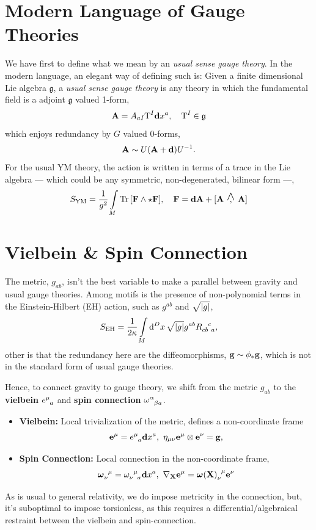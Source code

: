 \documentclass[a0,portrait]{a0poster}
\newcommand{\wedgecomma}{\stackon[1pt]{,}{\smash{\scriptsize$\wedge$}}}
\newcommand{\wedgecomm}[2]{\qty[ #1\ \wedgecomma\ #2 ]}
\begin{document}
\begin{multicols}{2}

\section*{Modern Language of Gauge Theories}

We have first to define what we mean by an \textit{usual sense gauge theory}. In the modern language, an 
elegant way of defining such is: Given a finite dimensional Lie algebra $\mathfrak g$, a \textit{usual sense gauge theory} is 
any theory in which the fundamental field is a adjoint $\mathfrak g$ valued 1-form, \[\vb A= A_{a I }\textnormal{T}^I\vb dx^a,\ \ \ \textnormal{T}^I\in\mathfrak g\] 
which enjoys redundancy by $G$ valued 0-forms, \[\vb A\sim U\qty(\vb A+\vb d)U^{-1}.\] 
For the usual YM theory, the action is written in terms of a trace in the Lie algebra --- which could be any symmetric, non-degenerated, bilinear form ---,
\[ S_{\textnormal{YM}}= \frac{1}{g^2}\int\limits_M\Tr\qty[\vb F\wedge \star \vb F],\ \ \ \vb F = \vb d\vb A+\wedgecomm{\vb A}{\vb A}\]

\section*{Vielbein \& Spin Connection}

The metric, $g_{ab}$, isn't the best variable to make a parallel between gravity and usual gauge theories. Among motifs is 
the presence of non-polynomial terms in the Einstein-Hilbert (EH) action, such as $g^{ab}$ and $\sqrt{\abs{g}}$,
\[S_{\textnormal{EH}}=\frac{1}{2\kappa}\int\limits_M \dd[D]{x}\sqrt{\abs{g}}g^{ab}\tensor{R}{_c_b^c_a},\]
other is that the redundancy here are the diffeomorphisms, $\vb g \sim \phi_\ast\vb g$, which is not in the standard form of usual 
gauge theories.

Hence, to connect gravity to gauge theory, we shift from the metric $g_{ab}$ to the \textbf{vielbein} $\tensor{e}{^\mu_a}$ and \textbf{spin connection} $\tensor{\omega}{^\alpha_\beta_a}$.

\begin{itemize}
    \item \textbf{Vielbein:} Local trivialization of the metric, defines a non-coordinate frame\[\vb e^\mu=\tensor{ e}{^\mu_a}\vb dx^a,\ \eta_{\mu\nu}\vb e^\mu\otimes\vb e^\nu=\vb g,\]
    \item \textbf{Spin Connection:} Local connection in the non-coordinate frame, \[\tensor{\boldsymbol \omega}{_\nu^\mu}=\tensor{ \omega}{_\nu^\mu_a}\vb d x^a,\ \nabla_{\vb X} \vb e^\mu=\tensor{\boldsymbol \omega\qty(\vb X)}{_\nu^\mu}\vb e^\nu\]
\end{itemize}
As is usual to general relativity, we do impose metricity in the connection, but, it's suboptimal to impose 
torsionless, as this requires a differential/algebraical restraint between the vielbein and spin-connection.


\end{multicols}
\end{document}

